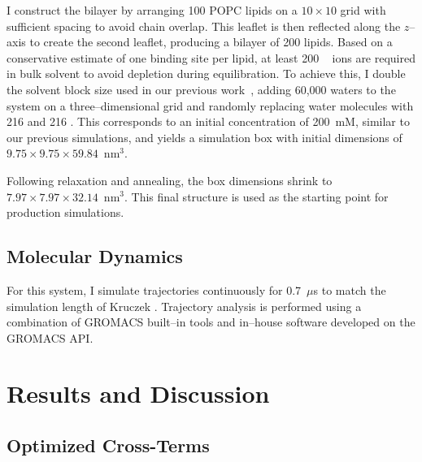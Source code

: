 I construct the bilayer by arranging 100 POPC lipids on a $10 \times 10$ grid
with sufficient spacing to avoid chain overlap. This leaflet is then reflected
along the $z$--axis to create the second leaflet, producing a bilayer of
200 lipids. Based on a conservative estimate of one binding site per lipid,
at least 200 \na~ ions are required in bulk solvent to avoid depletion during
equilibration. To achieve this, I double the solvent block size used in our
previous work~\cite{kruczek:2017,kruczek:2019}, adding 60,000 waters to the
system on a three--dimensional grid and randomly replacing water molecules with
216 \na and 216 \cl. This corresponds to an initial concentration of 200~mM,
similar to our previous simulations, and yields a simulation box with initial
dimensions of $9.75 \times 9.75 \times 59.84$~nm$^3$.

Following relaxation and annealing, the box dimensions shrink to
$7.97 \times 7.97 \times 32.14$~nm$^3$. This final structure is used as the
starting point for production simulations.

\subsection{Molecular Dynamics}

For this system, I simulate trajectories continuously for 0.7~$\mu$s to match the simulation length of Kruczek \etal{}\cite{kruczek:2017,kruczek:2019}.
Trajectory analysis is performed using a combination of GROMACS built--in
tools and in--house software developed on the GROMACS API.


\section{Results and Discussion}

\subsection{Optimized Cross-Terms}

